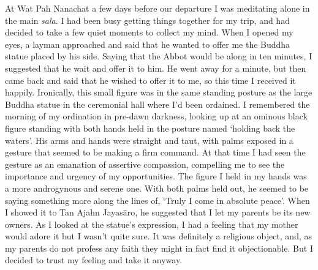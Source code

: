 At Wat Pah Nanachat a few days before our departure I was meditating
alone in the main \emph{sala}. I had been busy getting things together
for my trip, and had decided to take a few quiet moments to collect my
mind. When I opened my eyes, a layman approached and said that he wanted
to offer me the Buddha statue placed by his side. Saying that the Abbot
would be along in ten minutes, I suggested that he wait and offer it to
him. He went away for a minute, but then came back and said that he
wished to offer it to me, so this time I received it happily.
Ironically, this small figure was in the same standing posture as the
large Buddha statue in the ceremonial hall where I'd been ordained. I
remembered the morning of my ordination in pre-dawn darkness, looking up
at an ominous black figure standing with both hands held in the posture
named `holding back the waters'. His arms and hands were straight and
taut, with palms exposed in a gesture that seemed to be making a firm
command. At that time I had seen the gesture as an emanation of
assertive compassion, compelling me to see the importance and urgency of
my opportunities. The figure I held in my hands was a more androgynous
and serene one. With both palms held out, he seemed to be saying
something more along the lines of, `Truly I come in absolute peace'.
When I showed it to Tan Ajahn Jayasāro, he suggested that I let my
parents be its new owners. As I looked at the statue's expression, I had
a feeling that my mother would adore it but I wasn't quite sure. It was
definitely a religious object, and, as my parents do not profess any
faith they might in fact find it objectionable. But I decided to trust
my feeling and take it anyway.

